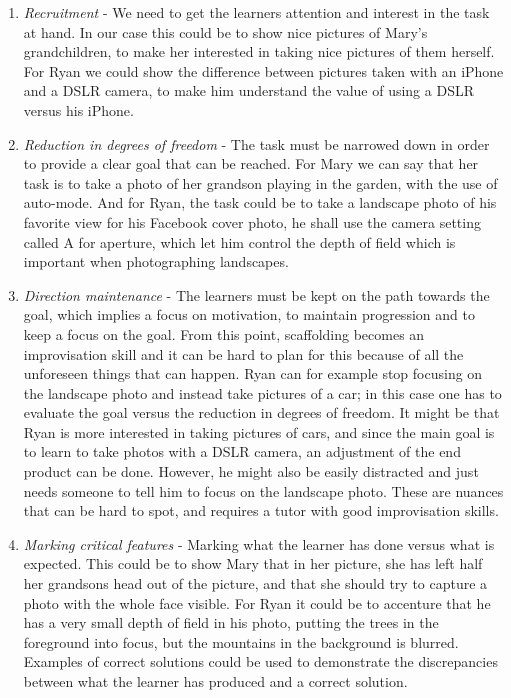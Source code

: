 \begin{enumerate}
\item{} \emph{Recruitment} - We need to get the learners attention and interest in the task at hand. In our case this could be to show nice pictures of Mary's grandchildren, to make her interested in taking nice pictures of them herself. For Ryan we could show the difference between pictures taken with an iPhone and a DSLR camera, to make him understand the value of using a DSLR versus his iPhone.
\item{} \emph{Reduction in degrees of freedom} - The task must be narrowed down in order to provide a clear goal that can be reached. For Mary we can say that her task is to take a photo of her grandson playing in the garden, with the use of auto-mode. And for Ryan, the task could be to take a landscape photo of his favorite view for his Facebook cover photo, he shall use the camera setting called A for aperture, which let him control the depth of field which is important when photographing landscapes. 
\item{} \emph{Direction maintenance} - The learners must be kept on the path towards the goal, which implies a focus on motivation, to maintain progression and to keep a focus on the goal. From this point, scaffolding becomes an improvisation skill and it can be hard to plan for this because of all the unforeseen things that can happen. Ryan can for example stop focusing on the landscape photo and instead take pictures of a car; in this case one has to evaluate the goal versus the reduction in degrees of freedom. It might be that Ryan is more interested in taking pictures of cars, and since the main goal is to learn to take photos with a DSLR camera, an adjustment of the end product can be done. However, he might also be easily distracted and just needs someone to tell him to focus on the landscape photo. These are nuances that can be hard to spot, and requires a tutor with good improvisation skills.
\item{} \emph{Marking critical features} - Marking what the learner has done versus what is expected. This could be to show Mary that in her picture, she has left half her grandsons head out of the picture, and that she should try to capture a photo with the whole face visible. For Ryan it could be to accenture that he has a very small depth of field in his photo, putting the trees in the foreground into focus, but the mountains in the background is blurred. Examples of correct solutions could be used to demonstrate the discrepancies between what the learner has produced and a correct solution.

\end{enumerate}

